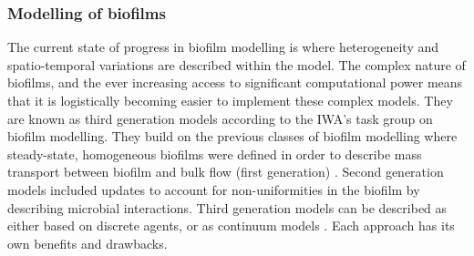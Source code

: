 \subsubsection{Modelling of biofilms}
The current state of progress in biofilm modelling is where heterogeneity and spatio-temporal variations are described within the model. The complex nature of biofilms, and the ever increasing access to significant computational power means that it is logistically becoming easier to implement these complex models. They are known as third generation models according to the IWA's task group on biofilm modelling. They build on the previous classes of biofilm modelling where steady-state, homogeneous biofilms were defined in order to describe mass transport between biofilm and bulk flow (first generation) \cite{wanner2006}. Second generation models included updates to account for non-uniformities in the biofilm by describing microbial interactions. Third generation models can be described as either based on discrete agents, or as continuum models \cite{dacunto2017}. Each approach has its own benefits and drawbacks.\\

